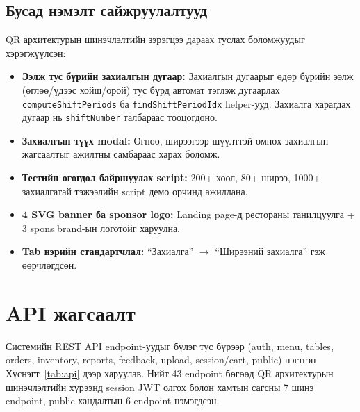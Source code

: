 \subsection{Бусад нэмэлт сайжруулалтууд}

QR архитектурын шинэчлэлтийн зэрэгцээ дараах туслах боломжуудыг хэрэгжүүлсэн:
\begin{itemize}
  \item \textbf{Ээлж тус бүрийн захиалгын дугаар:} Захиалгын дугаарыг өдөр
    бүрийн ээлж (өглөө/үдээс хойш/орой) тус бүрд автомат тэглэж дугаарлах
    \texttt{computeShiftPeriods} ба \texttt{findShiftPeriodIdx} helper-ууд.
    Захиалга харагдах дугаар нь \texttt{shiftNumber} талбараас тооцогдоно.
  \item \textbf{Захиалгын түүх modal:} Огноо, ширээгээр шүүлттэй өмнөх захиалгын
    жагсаалтыг ажилтны самбараас харах боломж.
  \item \textbf{Тестийн өгөгдөл байршуулах script:} 200+ хоол, 80+ ширээ, 1000+
    захиалгатай тэжээлийн script демо орчинд ажиллана.
  \item \textbf{4 SVG banner ба sponsor logo:} Landing page-д рестораны
    танилцуулга + 3 spons brand-ын логотойг харуулна.
  \item \textbf{Tab нэрийн стандартчлал:} ``Захиалга'' $\to$
    ``Ширээний захиалга'' гэж өөрчлөгдсөн.
\end{itemize}

\section{API жагсаалт}

Системийн REST API endpoint-уудыг бүлэг тус бүрээр (auth, menu, tables,
orders, inventory, reports, feedback, upload, session/cart, public) нэгтгэн
Хүснэгт~\ref{tab:api} дээр харуулав. Нийт 43 endpoint бөгөөд QR архитектурын
шинэчлэлтийн хүрээнд session JWT олгох болон хамтын сагсны 7 шинэ endpoint,
public хандалтын 6 endpoint нэмэгдсэн.

